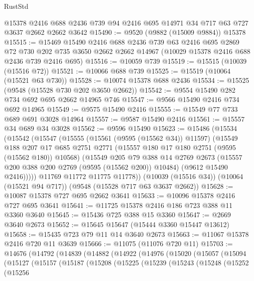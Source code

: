 \begin{lexlean}{RustStd}
\begin{coremodule}
    @15378
    @2416
    @688
    @2436
    @739
    @94
    @2416
    @695
    @14971
    @34
    @717
    @63
    @727
    @3637
    @2662
    @2662
    @3642
@15490 := @9520 (@9882 (@15009 @9884)) @15378
@15515 := @15469
    @15490
    @2416
    @688
    @2436
    @739
    @63
    @2416
    @695
    @2869
    @72
    @730
    @202
    @735
    @3650
    @2662
    @2662
    @14967
    (@10029 @15378 @2416 @688 @2436 @739 @2416 @695)
@15516 := @10059 @739
@15519 := @15515 (@10039 (@15516 @72))
@15521 := @10066 @688 @739
@15525 := @15519 (@10064 (@15521 @63 @730))
@15528 := @10074 @15378 @688 @2436
@15534 := @15525 (@9548 (@15528 @730 @202 @3650 @2662))
@15542 := @9554 @15490 @282 @734 @692 @695 @2662 @14965 @746
@15547 := @9566 @15490 @2416 @734 @692 @14965
@15549 := @9575 @15490 @2416
@15555 := @15549 @77 @733 @689 @691 @3028 @14964
@15557 := @9587 @15490 @2416
@15561 := @15557 @34 @689 @34 @3028
@15562 := @9596 @15490
@15623 := @15486
    (@15534
      (@15542
        (@15547
          (@15555
            (@15561 (@9595 (@15562 @34)) @11597)
            (@15549
              @188
              @207
              @17
              @685
              @2751
              @2771
              (@15557 @180 @17 @180 @2751 (@9595 (@15562 @180)) @10568)
              (@15549
                @205
                @79
                @388
                @14
                @2769
                @2673
                (@15557 @200 @388 @200 @2769 (@9595 (@15562 @200)) @10484)
                (@9612 @15490 @2416)))))
        @11769
        @11772
        @11775
        @11778))
    (@10039 (@15516 @34))
    (@10064 (@15521 @94 @717))
    (@9548 (@15528 @717 @63 @3637 @2662))
@15628 := @10087 @15378 @727 @695 @2662 @3641
@15633 := @10096 @15378 @2416 @727 @695 @3641
@15641 := @11725 @15378 @2416 @186 @723 @388 @11 @3360 @3640
@15645 := @15436 @725 @388 @15 @3360
@15647 := @2669 @3640 @2673
@15652 := @15645 @15647 (@15444 @3360 @15447 @13612)
@15658 := @15435 @723 @79 @11 @14 @3640 @2673
@15663 := @11067 @15378 @2416 @720 @11 @3639
@15666 := @11075 (@11076 @720 @11)
@15703 := @14676
    (@14792
      (@14839
        (@14882
          (@14922
            (@14976
              (@15020
                (@15057
                  (@15094
                    (@15127
                      (@15157
                        (@15187
                          (@15208
                            (@15225
                              (@15239
                                (@15243
                                  (@15248
                                    (@15252
                                      (@15256

\end{coremodule}
\end{lexlean}
